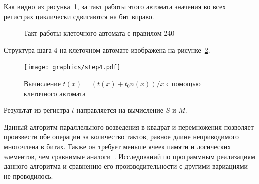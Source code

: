 \documentclass[times,specification,annotation]{itmo-student-thesis}
\begin{document}
Как видно из рисунка~\ref{fig:cell}, за такт работы этого автомата значения во всех регистрах циклически сдвигаются на бит вправо.
\begin{figure}[!h]
    \caption{Такт работы клеточного автомата с правилом 240}\label{fig:cell}
\end{figure}
Структура шага 4 на клеточном автомате изображена на рисунке~\ref{fig:step4}.
\begin{figure}[!b]
    \caption{Вычисление $t(x) = (t(x) + t_0 n(x))/x$ с помощью клеточного автомата}\label{fig:step4}
    \texttt{[image: graphics/step4.pdf]}
\end{figure}
Результат из регистра $t$ направляется на вычисление $S$ и $M$.

Данный алгоритм параллельного возведения в квадрат и перемножения позволяет
произвести обе операции за количество тактов, равное длине неприводимого многочлена в битах.
Также он требует меньше ячеек памяти и логических элементов, чем сравнимые аналоги~\cite{ku04}.
Исследований по программным реализациям данного алгоритма и сравнению его производительности с другими вариациями не проводилось.
\end{document}
